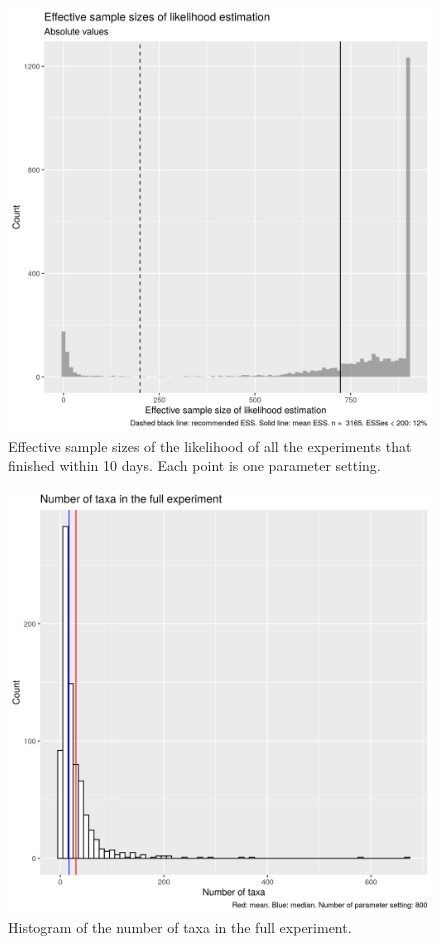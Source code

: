 \begin{figure}[!htbp]
  \includegraphics[width=\textwidth]{20200204_fig_esses.png}
  \caption{
    Effective sample sizes of the likelihood of all the experiments that
    finished within 10 days. 
    Each point is one parameter setting.
  }
  \label{fig:esses}
\end{figure}

\begin{figure}[!htbp]
  \includegraphics[width=\textwidth]{20200204_fig_n_taxa.png}
  \caption{
    Histogram of the number of taxa in the full experiment.
  }
  \label{fig:n_taxa}
\end{figure}

